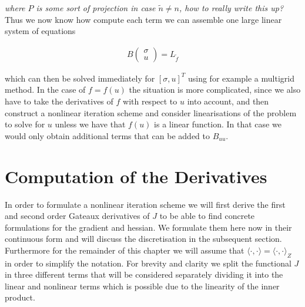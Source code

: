 \documentclass[../draft_1.tex]{subfiles}
\begin{document}
\textit{where $P$ is some sort of projection in case $\tilde{n} \neq n$, how to really write this up?} \\
Thus we now know how compute each term we can assemble one large linear system of equations
\begin{ceqn}
	\begin{align}
B
\begin{pmatrix}
\sigma \\
u
\end{pmatrix} = L_{\tilde{f}}
	\end{align}
\end{ceqn}
which can then be solved immediately for $[\sigma, u]^T$ using for example a multigrid method. In the case of $f = f(u)$ the situation is more complicated, since we also have to take the derivatives of $f$ with respect to $u$ into account, and then construct a nonlinear iteration scheme and consider linearisations of the problem to solve for $u$ unless we have that $f(u)$ is a linear function. In that case we would only obtain additional terms that can be added to $B_{uu}$. 


\section{Computation of the Derivatives}
In order to formulate a nonlinear iteration scheme we will first derive the first and second order Gateaux derivatives of $J$ to be able to find concrete formulations for the gradient and hessian. We formulate them here now in their continuous form and will discuss the discretisation in the subsequent section. Furthermore for the remainder of this chapter we will assume that $\langle \cdot, \cdot \rangle = \langle \cdot, \cdot \rangle _Z$ in order to simplify the notation. For brevity and clarity we split the functional $J$ in three different terms that will be considered separately dividing it into the linear and nonlinear terms which is possible due to the linearity of the inner product. 
\end{document}
